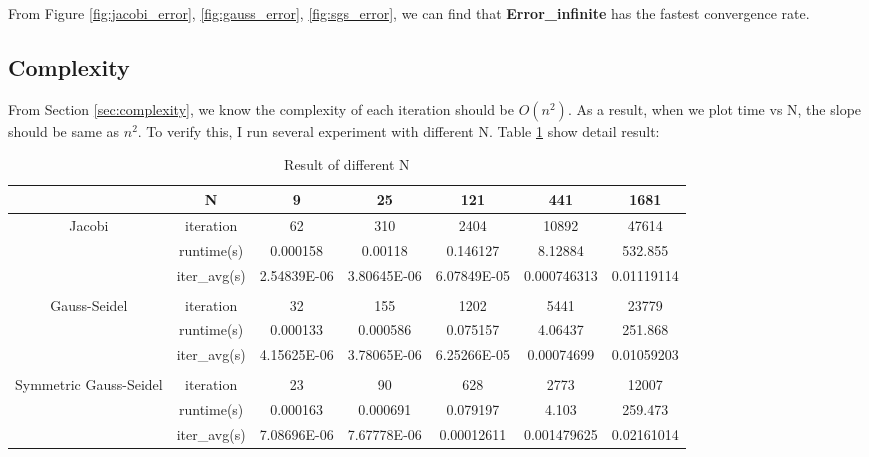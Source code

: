 \documentclass{article}
\begin{document}
From Figure \ref{fig:jacobi_error}, \ref{fig:gauss_error}, \ref{fig:sgs_error}, we can find that \textbf{Error\_infinite} 
has the fastest convergence rate.

\subsection{Complexity}
From Section \ref{sec:complexity}, we know the complexity of each iteration should be $O(n^2)$. As a result, when we plot 
time vs N, the slope should be same as $n^2$. To verify this, I run several experiment with different N. Table \ref{tab:N} show 
detail result:
\begin{table}[H]
  \centering
    \begin{tabular}{|c|c|c|c|c|c|c|}
    \hline
        & N   & 9   & 25  & 121 & 441 & 1681 \bigstrut\\
    \hline
    \multirow{3}[6]{*}{Jacobi} & iteration & 62  & 310 & 2404 & 10892 & 47614 \bigstrut\\
\cline{2-7}        & runtime(s) & 0.000158 & 0.00118 & 0.146127 & 8.12884 & 532.855 \bigstrut\\
\cline{2-7}        & iter\_avg(s) & 2.54839E-06 & 3.80645E-06 & 6.07849E-05 & 0.000746313 & 0.01119114 \bigstrut\\
    \hline
    \multicolumn{1}{|r}{} & \multicolumn{1}{r}{} & \multicolumn{1}{r}{} & \multicolumn{1}{r}{} & \multicolumn{1}{r}{} & \multicolumn{1}{r}{} &  \bigstrut\\
    \hline
    \multirow{3}[6]{*}{Gauss-Seidel} & iteration & 32  & 155 & 1202 & 5441 & 23779 \bigstrut\\
\cline{2-7}        & runtime(s) & 0.000133 & 0.000586 & 0.075157 & 4.06437 & 251.868 \bigstrut\\
\cline{2-7}        & iter\_avg(s) & 4.15625E-06 & 3.78065E-06 & 6.25266E-05 & 0.00074699 & 0.01059203 \bigstrut\\
    \hline
    \multicolumn{1}{|r}{} & \multicolumn{1}{r}{} & \multicolumn{1}{r}{} & \multicolumn{1}{r}{} & \multicolumn{1}{r}{} & \multicolumn{1}{r}{} &  \bigstrut\\
    \hline
    \multirow{3}[6]{*}{Symmetric Gauss-Seidel} & iteration & 23  & 90  & 628 & 2773 & 12007 \bigstrut\\
\cline{2-7}        & runtime(s) & 0.000163 & 0.000691 & 0.079197 & 4.103 & 259.473 \bigstrut\\
\cline{2-7}        & iter\_avg(s) & 7.08696E-06 & 7.67778E-06 & 0.00012611 & 0.001479625 & 0.02161014 \bigstrut\\
    \hline
    \end{tabular}%
  \caption{Result of different N}
  \label{tab:N}%
\end{table}%
\end{document}
